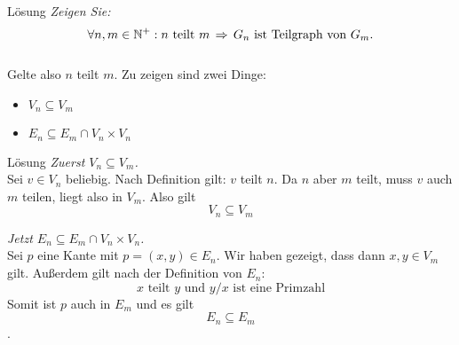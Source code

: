 \begin{frame}{Lösung}
	\textit{Zeigen Sie: $$\forall n, m \in \N^+: n \text{ teilt } m \impl G_n \text{ ist Teilgraph von } G_m.$$}\\[2em] \pause
	Gelte also $n$ teilt $m$. Zu zeigen sind zwei Dinge:
	\begin{itemize}
		\item $V_n \subseteq V_m$
		\item $E_n \subseteq E_m \cap V_n \times V_n$
	\end{itemize}
	
\end{frame}

\begin{frame}{Lösung}
	\textit{Zuerst $V_n \subseteq V_m$.} \\[1em] \pause
	Sei $v \in V_n$ beliebig. Nach Definition gilt: $v$ teilt $n$. Da $n$ aber $m$ teilt, muss $v$ auch $m$ teilen, liegt also in $V_m$. Also gilt $$V_n \subseteq V_m$$ \pause
	
	\textit{Jetzt $E_n \subseteq E_m \cap V_n \times V_n$.} \\[1em] \pause
	Sei $p$ eine Kante mit $p = (x,y) \in E_n$. Wir haben gezeigt, dass dann $x,y \in V_m$ gilt. Außerdem gilt nach der Definition von $E_n$: $$x \text{ teilt } y \text{ und } y/x \text{ ist eine Primzahl}$$ Somit ist $p$ auch in $E_m$ und es gilt $$E_n \subseteq E_m$$.
\end{frame}